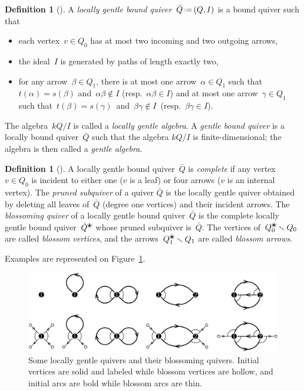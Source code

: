 \documentclass{amsart}
\theoremstyle{definition}
\newtheorem{definition}[theorem]{Definition}
\newcommand{\ssm}{\smallsetminus} %
\newcommand{\eqdef}{\mbox{\,\raisebox{0.2ex}{\scriptsize\ensuremath{\mathrm:}}\ensuremath{=}\,}} %
\newcommand{\fref}[1]{Figure~\ref{#1}} %
\newcommand{\darkblue}{\color{darkblue}} %
\newcommand{\defn}[1]{\textsl{\darkblue #1}} %
\newcommand{\blossom}{^\text{\ding{96}}} %
\begin{document}
\begin{definition}[\cite{ButlerRingel}]
\label{def:gentleQuiver}
A \defn{locally gentle bound quiver}~$\bar Q \eqdef (Q,I)$ is a bound quiver such that
\begin{itemize}
\item each vertex~$v \in Q_0$ has at most two incoming and two outgoing arrows,
\item the ideal~$I$ is generated by paths of length exactly two,
\item for any arrow~$\beta \in Q_1$, there is at most one arrow~$\alpha \in Q_1$ such that~$t(\alpha) = s(\beta)$ and~${\alpha\beta\notin I}$ (resp.~$\alpha\beta \in I$) and at most one arrow~$\gamma \in Q_1$ such that~$t(\beta) = s(\gamma)$~and~${\beta\gamma\notin I}$~(resp.~${\beta\gamma \in I}$).
\end{itemize}
The algebra~$kQ/I$ is called a \defn{locally gentle algebra}.
A \defn{gentle bound quiver} is a locally bound quiver~$\bar Q$ such that the algebra $kQ/I$ is finite-dimensional; the algebra is then called a \defn{gentle algebra}.
\end{definition}

\begin{definition}[\cite{PaluPilaudPlamondon}]
\label{def:blossomingQuiver}
A locally gentle bound quiver~$\bar Q$ is \defn{complete} if any vertex~$v \in Q_0$ is incident to either one ($v$ is a leaf) or four arrows ($v$ is an internal vertex).
The \defn{pruned subquiver} of a quiver $\bar Q$ is the locally gentle quiver obtained by deleting all leaves of~$\bar Q$ (degree one vertices) and their incident arrows.
The \defn{blossoming quiver} of a locally gentle bound quiver~$\bar Q$ is the complete locally gentle bound quiver~$\bar Q\blossom$ whose pruned subquiver is~$\bar Q$.
The vertices of~$Q\blossom_0 \ssm Q_0$ are called \defn{blossom vertices}, and the arrows~$Q\blossom_1 \ssm Q_1$ are called \defn{blossom arrows}.
\end{definition}

Examples are represented on \fref{fig:quivers}.

\begin{figure}[t]
	\capstart
	\centerline{\includegraphics[scale=.6]{quivers}}
	\caption{Some locally gentle quivers and their blossoming quivers. Initial vertices are solid and labeled while blossom vertices are hollow, and initial arcs are bold while blossom arcs are thin.}
	\label{fig:quivers}
\end{figure}
\end{document}

